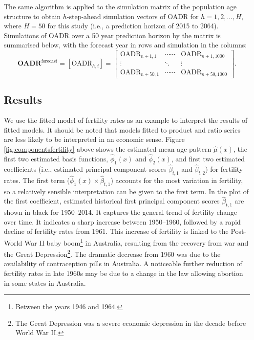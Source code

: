\documentclass[11pt,a4paper,]{article}
\begin{document}
The same algorithm is applied to the simulation matrix of the population age structure to obtain \(h\)-step-ahead simulation vectors of OADR for \(h=1,2,\dots,H\), where \(H=50\) for this study (i.e., a prediction horizon of 2015 to 2064). Simulations of OADR over a 50 year prediction horizon by the matrix is summarised below, with the forecast year in rows and simulation in the columns:
\[
  \bm{\text{OADR}}^{\text{forecast}}=\left[\text{OADR}_{h,i}\right] =
  \begin{bmatrix}
    \text{OADR}_{n+1,1} & \cdots\cdots & \text{OADR}_{n+1,1000} \\
    \vdots & \ddots & \vdots \\
    \text{OADR}_{n+50,1} & \cdots\cdots & \text{OADR}_{n+50,1000}
  \end{bmatrix}.
\]

\hypertarget{results}{%
\subsection{Results}\label{results}}

We use the fitted model of fertility rates as an example to interpret the results of fitted models. It should be noted that models fitted to product and ratio series are less likely to be interpreted in an economic sense. Figure \ref{fig:componentsfertility} above shows the estimated mean age pattern \(\widehat{\mu}(x)\), the first two estimated basis functions, \(\widehat{\phi}_1(x)\) and \(\widehat{\phi}_2(x)\), and first two estimated coefficients (i.e., estimated principal component scores \(\widehat{\beta}_{t,1}\) and \(\widehat{\beta}_{t,2}\)) for fertility rates. The first term (\(\widehat{\phi}_1(x)\times \widehat{\beta}_{t,1}\)) accounts for the most variation in fertility, so a relatively sensible interpretation can be given to the first term. In the plot of the first coefficient, estimated historical first principal component scores \(\widehat{\beta}_{t,1}\) are shown in black for 1950--2014. It captures the general trend of fertility change over time. It indicates a sharp increase between 1950--1960, followed by a rapid decline of fertility rates from 1961. This increase of fertility is linked to the Post-World War II baby boom\footnote{Between the years 1946 and 1964.} in Australia, resulting from the recovery from war and the Great Depression\footnote{The Great Depression was a severe economic depression in the decade before World War II.}. The dramatic decrease from 1960 was due to the availability of contraception pills in Australia. A noticeable further reduction of fertility rates in late 1960s may be due to a change in the law allowing abortion in some states in Australia.
\end{document}
